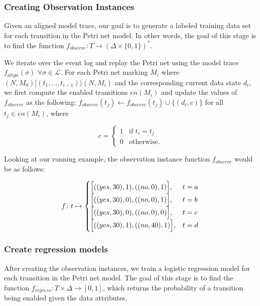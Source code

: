 \subsubsection*{Creating Observation Instances}

Given an aligned model trace, our goal is to generate a labeled training data set for each transition in the Petri net model. In other words, the goal of this stage is to find the function $f_{observe} \colon T \rightarrow (\Delta \times \{0, 1\})^*$.

We iterate over the event log and replay the Petri net using the model trace $f_{align}(\sigma)$ $\forall \sigma \in \mathcal{L}$. For each Petri net marking $M_i$ where $(N, M_0)[(t_1, \dots, t_{i-1}) \rangle (N, M_i)$ and the corresponding current data state $d_i$, we first compute the enabled transitions $en(M_i)$ and update the values of $f_{observe}$ as the following:
$f_{observe}(t_j) \leftarrow f_{observe}(t_j) \cup \{ (d_i, c)\}$ for all $t_j \in en(M_i)$, where

\[
    c =
    \begin{cases}
        1 & \text{if } t_i = t_j\\
        0 & \text{otherwise.}
    \end{cases}
\]

Looking at our running example, the observation instance function $f_{observe}$ would be as follows:

\[
    f \colon t \mapsto
    \begin{cases}
        \Bigl[((yes, 30), 1), ((no, 0), 1) \Bigr], & t = a\\
        \Bigl[((yes, 30), 0), ((no, 0), 1)\Bigr], & t = b\\
        \Bigl[((yes, 30), 0), ((no, 0), 0)\Bigr], & t = c\\
        \Bigl[ ((yes, 30), 1), ((no, 40), 1)\Bigr], & t = d\\
    \end{cases}
\]

\subsubsection*{Create regression models}

After creating the observation instances, we train a logistic regression model for each transition in the Petri net model. The goal of this stage is to find the function $f_{regress} \colon T \times \Delta \rightarrow [0 , 1]$, which returns the probability of a transition being enabled given the data attributes.

